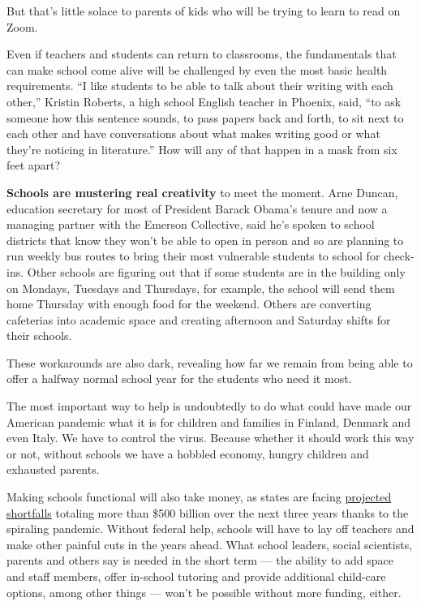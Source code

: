 But that's little solace to parents of kids who will be trying to learn
to read on Zoom.

Even if teachers and students can return to classrooms, the fundamentals
that can make school come alive will be challenged by even the most
basic health requirements. ``I like students to be able to talk about
their writing with each other,'' Kristin Roberts, a high school English
teacher in Phoenix, said, ``to ask someone how this sentence sounds, to
pass papers back and forth, to sit next to each other and have
conversations about what makes writing good or what they're noticing in
literature.'' How will any of that happen in a mask from six feet apart?

\textbf{Schools are mustering real creativity} to meet the moment. Arne
Duncan, education secretary for most of President Barack Obama's tenure
and now a managing partner with the Emerson Collective, said he's spoken
to school districts that know they won't be able to open in person and
so are planning to run weekly bus routes to bring their most vulnerable
students to school for check-ins. Other schools are figuring out that if
some students are in the building only on Mondays, Tuesdays and
Thursdays, for example, the school will send them home Thursday with
enough food for the weekend. Others are converting cafeterias into
academic space and creating afternoon and Saturday shifts for their
schools.

These workarounds are also dark, revealing how far we remain from being
able to offer a halfway normal school year for the students who need it
most.

The most important way to help is undoubtedly to do what could have made
our American pandemic what it is for children and families in Finland,
Denmark and even Italy. We have to control the virus. Because whether it
should work this way or not, without schools we have a hobbled economy,
hungry children and exhausted parents.

Making schools functional will also take money, as states are facing
\href{https://www.cbpp.org/research/state-budget-and-tax/states-continue-to-face-large-shortfalls-due-to-covid-19-effects}{projected
shortfalls} totaling more than \$500 billion over the next three years
thanks to the spiraling pandemic. Without federal help, schools will
have to lay off teachers and make other painful cuts in the years ahead.
What school leaders, social scientists, parents and others say is needed
in the short term --- the ability to add space and staff members, offer
in-school tutoring and provide additional child-care options, among
other things --- won't be possible without more funding, either.

